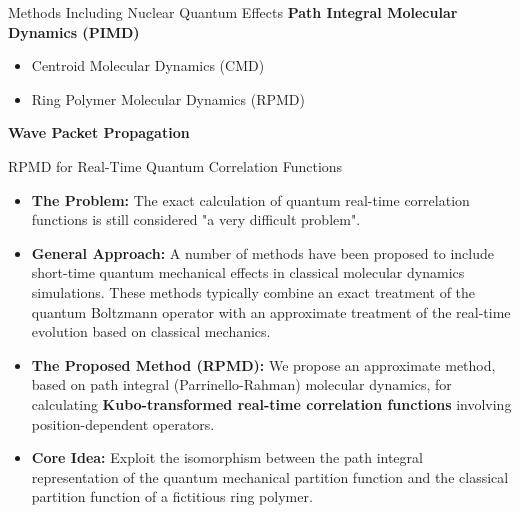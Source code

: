 \begin{frame}{Methods Including Nuclear Quantum Effects}
    \textbf{Path Integral Molecular Dynamics (PIMD)}
    \begin{itemize}
        \item Centroid Molecular Dynamics (CMD)
        \item Ring Polymer Molecular Dynamics (RPMD)
    \end{itemize}
    \vspace{1em}

    \textbf{Wave Packet Propagation}
\end{frame}
\begin{frame}{RPMD for Real-Time Quantum Correlation Functions}

\begin{itemize}
    \item \textbf{The Problem:} The exact calculation of quantum real-time correlation functions is still considered "a very difficult problem".
    
    \item \textbf{General Approach:} A number of methods have been proposed to include short-time quantum mechanical effects in classical molecular dynamics simulations. These methods typically combine an exact treatment of the quantum Boltzmann operator with an approximate treatment of the real-time evolution based on classical mechanics.
    
    \item \textbf{The Proposed Method (RPMD):} We propose an approximate method, based on path integral (Parrinello-Rahman) molecular dynamics, for calculating \textbf{Kubo-transformed real-time correlation functions} involving position-dependent operators.
    
    \item \textbf{Core Idea:} Exploit the isomorphism between the path integral representation of the quantum mechanical partition function and the classical partition function of a fictitious ring polymer.
\end{itemize}
\end{frame}

